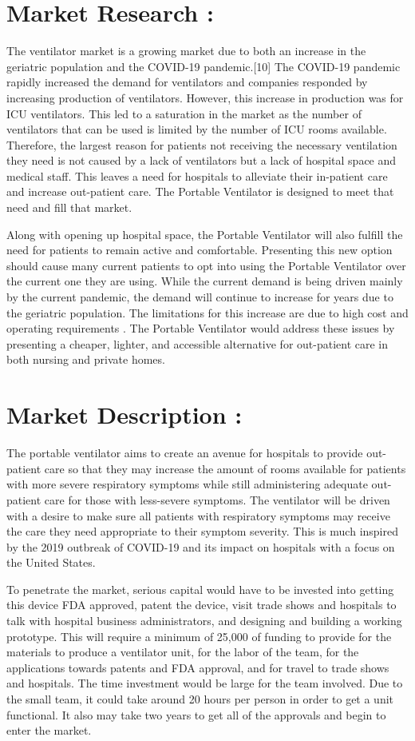 \documentclass[12pt]{article}
\begin{document}
\section*{Market Research : }
The ventilator market is a growing market due to both an increase in the geriatric
population and the COVID-19 pandemic.[10] The COVID-19 pandemic rapidly increased the
demand for ventilators and companies responded by increasing production of ventilators.
However, this increase in production was for ICU ventilators. This led to a saturation in the
market as the number of ventilators that can be used is limited by the number of ICU rooms
available. Therefore, the largest reason for patients not receiving the necessary ventilation they
need is not caused by a lack of ventilators but a lack of hospital space and medical staff. This
leaves a need for hospitals to alleviate their in-patient care and increase out-patient care. The
Portable Ventilator is designed to meet that need and fill that market.


Along with opening up hospital space, the Portable Ventilator will also fulfill the need for
patients to remain active and comfortable. Presenting this new option should cause many current
patients to opt into using the Portable Ventilator over the current one they are using.
While the current demand is being driven mainly by the current pandemic, the demand
will continue to increase for years due to the geriatric population. The limitations for this
increase are due to high cost and operating requirements . The Portable Ventilator would
address these issues by presenting a cheaper, lighter, and accessible alternative for out-patient
care in both nursing and private homes.

\section*{Market Description : }
The portable ventilator aims to create an avenue for hospitals to provide out-patient care
so that they may increase the amount of rooms available for patients with more severe
respiratory symptoms while still administering adequate out-patient care for those with
less-severe symptoms. The ventilator will be driven with a desire to make sure all patients with
respiratory symptoms may receive the care they need appropriate to their symptom severity. This
is much inspired by the 2019 outbreak of COVID-19 and its impact on hospitals with a focus on
the United States.


To penetrate the market, serious capital would have to be invested into getting this device
FDA approved, patent the device, visit trade shows and hospitals to talk with hospital business
administrators, and designing and building a working prototype. This will require a minimum of
25,000 of funding to provide for the materials to produce a ventilator unit, for the labor of the
team, for the applications towards patents and FDA approval, and for travel to trade shows and
hospitals. The time investment would be large for the team involved. Due to the small team, it
could take around 20 hours per person in order to get a unit functional. It also may take two years
to get all of the approvals and begin to enter the market.
\end{document}

